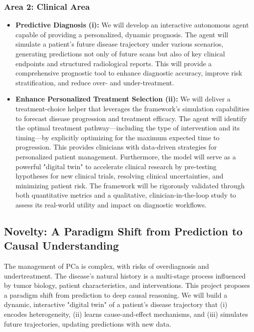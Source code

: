 \documentclass[11pt, a4paper]{article}
\begin{document}
\subsubsection*{Area 2: Clinical Area}
\begin{itemize}
    \item \textbf{Predictive Diagnosis (i):} We will develop an interactive autonomous agent capable of providing a personalized, dynamic prognosis. The agent will simulate a patient's future disease trajectory under various scenarios, generating predictions not only of future scans but also of key clinical endpoints and structured radiological reports. This will provide a comprehensive prognostic tool to enhance diagnostic accuracy, improve risk stratification, and reduce over- and under-treatment.

    \item \textbf{Enhance Personalized Treatment Selection (ii):} We will deliver a treatment-choice helper that leverages the framework's simulation capabilities to forecast disease progression and treatment efficacy. The agent will identify the optimal treatment pathway—including the type of intervention and its timing—by explicitly optimizing for the maximum expected time to progression. This provides clinicians with data-driven strategies for personalized patient management. Furthermore, the model will serve as a powerful "digital twin" to accelerate clinical research by pre-testing hypotheses for new clinical trials, resolving clinical uncertainties, and minimizing patient risk. The framework will be rigorously validated through both quantitative metrics and a qualitative, clinician-in-the-loop study to assess its real-world utility and impact on diagnostic workflows.
\end{itemize}

\subsection{Novelty: A Paradigm Shift from Prediction to Causal Understanding}
The management of PCa is complex, with risks of overdiagnosis and undertreatment. The disease's natural history is a multi-stage process influenced by tumor biology, patient characteristics, and interventions. This project proposes a paradigm shift from prediction to deep causal reasoning. We will build a dynamic, interactive "digital twin" of a patient’s disease trajectory that (i) encodes heterogeneity, (ii) learns cause-and-effect mechanisms, and (iii) simulates future trajectories, updating predictions with new data.
\end{document}
